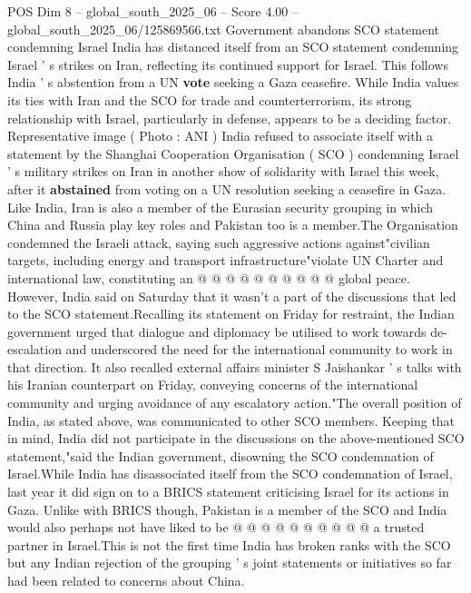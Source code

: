 \begin{textsample}{POS Dim 8 – global\_south\_2025\_06 – Score 4.00 – global\_south\_2025\_06/125869566.txt}  \label{ex:f8_pos_428}
Government abandons SCO statement condemning Israel India has distanced itself from an SCO statement condemning Israel ' s strikes on Iran, reflecting its continued support for Israel.
This follows India ' s abstention from a UN \textbf{vote} seeking a Gaza ceasefire.
While India values its ties with Iran and the SCO for trade and counterterrorism, its strong relationship with Israel, particularly in defense, appears to be a deciding factor.
Representative image ( Photo : ANI ) India refused to associate itself with a statement by the Shanghai Cooperation Organisation ( SCO ) condemning Israel ' s military strikes on Iran in another show of solidarity with Israel this week, after it \textbf{abstained} from voting on a UN resolution seeking a ceasefire in Gaza.
Like India, Iran is also a member of the Eurasian security grouping in which China and Russia play key roles and Pakistan too is a member.The Organisation condemned the Israeli attack, saying such aggressive actions against"civilian targets, including energy and transport infrastructure"violate UN Charter and international law, constituting an @ @ @ @ @ @ @ @ @ @ global peace.
However, India said on Saturday that it wasn't a part of the discussions that led to the SCO statement.Recalling its statement on Friday for restraint, the Indian government urged that dialogue and diplomacy be utilised to work towards de-escalation and underscored the need for the international community to work in that direction.
It also recalled external affairs minister S Jaishankar ' s talks with his Iranian counterpart on Friday, conveying concerns of the international community and urging avoidance of any escalatory action."The overall position of India, as stated above, was communicated to other SCO members.
Keeping that in mind, India did not participate in the discussions on the above-mentioned SCO statement,"said the Indian government, disowning the SCO condemnation of Israel.While India has disassociated itself from the SCO condemnation of Israel, last year it did sign on to a BRICS statement criticising Israel for its actions in Gaza.
Unlike with BRICS though, Pakistan is a member of the SCO and India would also perhaps not have liked to be @ @ @ @ @ @ @ @ @ @ a trusted partner in Israel.This is not the first time India has broken ranks with the SCO but any Indian rejection of the grouping ' s joint statements or initiatives so far had been related to concerns about China.

\end{textsample}
